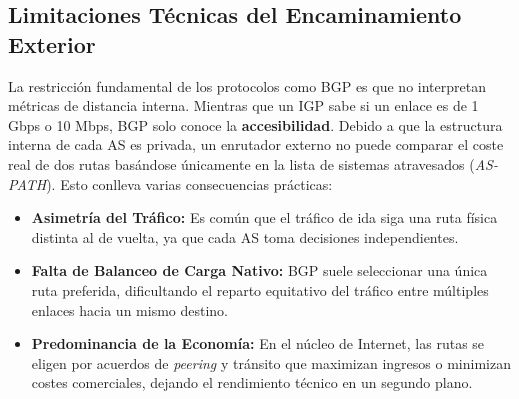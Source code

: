 \subsection{Limitaciones Técnicas del Encaminamiento Exterior}

La restricción fundamental de los protocolos como BGP es que no interpretan métricas de distancia interna. Mientras que un IGP sabe si un enlace es de 1 Gbps o 10 Mbps, BGP solo conoce la \textbf{accesibilidad}. Debido a que la estructura interna de cada AS es privada, un enrutador externo no puede comparar el coste real de dos rutas basándose únicamente en la lista de sistemas atravesados (\textit{AS-PATH}). Esto conlleva varias consecuencias prácticas:

\begin{itemize}
	\item \textbf{Asimetría del Tráfico:} Es común que el tráfico de ida siga una ruta física distinta al de vuelta, ya que cada AS toma decisiones independientes.
	\item \textbf{Falta de Balanceo de Carga Nativo:} BGP suele seleccionar una única ruta preferida, dificultando el reparto equitativo del tráfico entre múltiples enlaces hacia un mismo destino.
	\item \textbf{Predominancia de la Economía:} En el núcleo de Internet, las rutas se eligen por acuerdos de \textit{peering} y tránsito que maximizan ingresos o minimizan costes comerciales, dejando el rendimiento técnico en un segundo plano.
\end{itemize}
